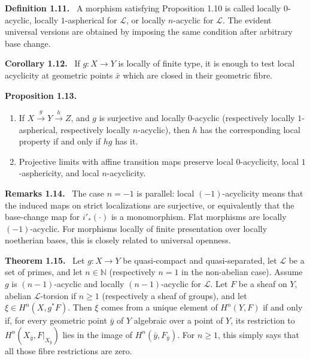 \documentclass[12pt]{article}
\newcommand{\LL}{\mathcal L}
\newenvironment{statement}[1]{\par\medskip\noindent\textbf{#1.}\ }{\par\medskip}
\newenvironment{remarktext}[1]{\par\medskip\noindent\textbf{#1.}\ }{\par\medskip}
\begin{document}
\begin{statement}{Definition 1.11}
A morphism satisfying Proposition 1.10 is called locally \(0\)-acyclic, locally \(1\)-aspherical for \(\LL\), or locally \(n\)-acyclic for \(\LL\). The evident universal versions are obtained by imposing the same condition after arbitrary base change.
\end{statement}

\begin{statement}{Corollary 1.12}
If \(g:X\to Y\) is locally of finite type, it is enough to test local acyclicity at geometric points \(\bar x\) which are closed in their geometric fibre.
\end{statement}

\begin{statement}{Proposition 1.13}
\begin{enumerate}[label=(\roman*)]
\item If \(X\xrightarrow gY\xrightarrow hZ\), and \(g\) is surjective and locally \(0\)-acyclic (respectively locally \(1\)-aspherical, respectively locally \(n\)-acyclic), then \(h\) has the corresponding local property if and only if \(hg\) has it.
\item Projective limits with affine transition maps preserve local \(0\)-acyclicity, local \(1\)-asphericity, and local \(n\)-acyclicity.
\end{enumerate}
\end{statement}

\begin{remarktext}{Remarks 1.14}
The case \(n=-1\) is parallel: local \((-1)\)-acyclicity means that the induced maps on strict localizations are surjective, or equivalently that the base-change map for \(i'_*(\cdot)\) is a monomorphism. Flat morphisms are locally \((-1)\)-acyclic. For morphisms locally of finite presentation over locally noetherian bases, this is closely related to universal openness.
\end{remarktext}

\begin{statement}{Theorem 1.15}
Let \(g:X\to Y\) be quasi-compact and quasi-separated, let \(\LL\) be a set of primes, and let \(n\in\mathbb N\) (respectively \(n=1\) in the non-abelian case). Assume \(g\) is \((n-1)\)-acyclic and locally \((n-1)\)-acyclic for \(\LL\). Let \(F\) be a sheaf on \(Y\), abelian \(\LL\)-torsion if \(n\ge1\) (respectively a sheaf of groups), and let \(\xi\in H^n(X,g^*F)\). Then \(\xi\) comes from a unique element of \(H^n(Y,F)\) if and only if, for every geometric point \(\bar y\) of \(Y\) algebraic over a point of \(Y\), its restriction to \(H^n(X_{\bar y},F|_{X_{\bar y}})\) lies in the image of \(H^n(\bar y,F_{\bar y})\). For \(n\ge1\), this simply says that all those fibre restrictions are zero.
\end{statement}
\end{document}
